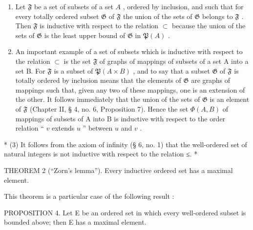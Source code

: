 \begin{enumerate}
\def\labelenumi{(\arabic{enumi})}
\item
  Let \(\mathfrak{F}\) be a set of subsets of a set \(A\) , ordered by inclusion, and such that for every totally ordered subset \(\mathfrak{G}\) of \(\mathfrak{F}\) the union of the sets of \(\mathfrak{G}\) belongs to \(\mathfrak{F}\) . Then \(\mathfrak{F}\) is inductive with respect to the relation \(\subset\) because the union of the sets of \(\mathfrak{G}\) is the least upper bound of \(\mathfrak{G}\) in \(\mathfrak{P}(A)\) .
\item
  An important example of a set of subsets which is inductive with respect to the relation \(\subset\) is the set \(\mathfrak{F}\) of graphs of mappings of subsets of a set A into a set B. For \(\mathfrak{F}\) is a subset of \(\mathfrak{P}(A \times B)\) , and to say that a subset \(\mathfrak{G}\) of \(\mathfrak{F}\) is totally ordered by inclusion means that the elements of \(\mathfrak{G}\) are graphs of mappings such that, given any two of these mappings, one is an extension of the other. It follows immediately that the union of the sets of \(\mathfrak{G}\) is an element of \(\mathfrak{F}\) (Chapter II, § 4, no. 6, Proposition 7). Hence the set \(\Phi(A, B)\) of mappings of subsets of A into B is inductive with respect to the order relation `` \(v\) extends \(u\) '' between \(u\) and \(v\) .
\end{enumerate}

* (3) It follows from the axiom of infinity (§ 6, no. 1) that the well-ordered set of natural integers is not inductive with respect to the relation ≤. *

THEOREM 2 (``Zorn's lemma''). Every inductive ordered set has a maximal element.

This theorem is a particular case of the following result :

PROPOSITION 4. Let E be an ordered set in which every well-ordered subset is bounded above; then E has a maximal element.

